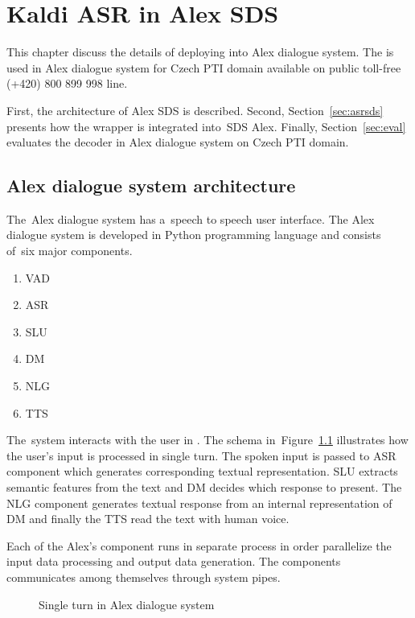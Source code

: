 \chapter{Kaldi \acs{ASR} in Alex \acs{SDS}}
\label{cha:integration}

This chapter discuss the details of deploying  into Alex dialogue system.
The  is used in Alex dialogue system for Czech \acf{PTI} domain available on public toll-free (+420) 800 899 998 line.

First, the architecture of Alex \acf{SDS} is described.
Second, Section~\ref{sec:asrsds} presents how the wrapper  is integrated into~\ac{SDS} Alex.
Finally, Section~\ref{sec:eval} evaluates the decoder in Alex dialogue system on Czech \ac{PTI} domain. 

\section{Alex dialogue system architecture} 
\label{sec:arch}

The~Alex dialogue system has a~speech to speech user interface. 
The Alex dialogue system is developed in Python programming language and consists of~six major components. 
\begin{enumerate}
    \item \acf{VAD} 
    \item \acf{ASR}
    \item \acf{SLU}
    \item \acf{DM}
    \item \acf{NLG}
    \item \acf{TTS}
\end{enumerate}
The~system interacts with the user in . 
The schema in~Figure~\ref{fig:alex} illustrates how the user's input is processed in single turn.
The spoken input is passed to \ac{ASR} component which generates corresponding textual representation.
\ac{SLU} extracts semantic features from the text and \ac{DM} decides which response to present.
The \ac{NLG} component generates textual response from an internal representation of \ac{DM} and finally the \ac{TTS} read the text with human voice.

Each of the Alex's component runs in separate process in order parallelize the input data processing and output data generation.
The components communicates among themselves through system pipes.

\begin{figure}
    \begin{center}
    
    \caption{Single turn in Alex dialogue system}
    \label{fig:alex} 
    \end{center}
\end{figure}

